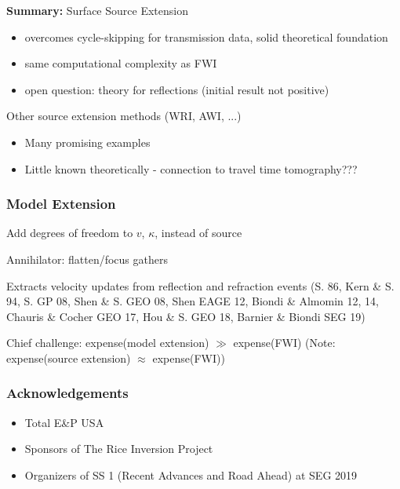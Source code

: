 \documentclass[xcolor=dvipsnames,12pt,aspectratio=169]{beamer}
\begin{document}
\begin{frame}
{\color{blue} {\bf Summary:}} Surface Source Extension 

\begin{itemize}
\item overcomes cycle-skipping for transmission data, solid theoretical foundation
\item same computational complexity as FWI
\item open question: theory for reflections {\color{blue} (initial result not positive)}
\end{itemize}

Other source extension methods (WRI, AWI, ...)

\begin{itemize}
\item Many promising examples 
\item Little known theoretically - connection to travel time tomography???
\end{itemize}
\end{frame}

\begin{frame}\frametitle{Model Extension}
Add degrees of freedom to $v$, $\kappa$, instead of source

Annihilator: flatten/focus gathers

{\color{blue}Extracts velocity updates from reflection and refraction events} (S. 86, Kern \& S. 94, S. GP 08, Shen \& S. GEO 08, Shen EAGE 12, Biondi \& Almomin 12, 14, Chauris \& Cocher GEO 17, Hou \& S. GEO 18, Barnier \& Biondi SEG 19)

Chief challenge: expense(model extension) $\gg$ expense(FWI) (Note: expense(source extension) $\approx$ expense(FWI))
\end{frame}


\begin{frame}\frametitle{Acknowledgements}
\begin{itemize}
\item Total E\&P USA
\item Sponsors of The Rice Inversion Project
\item Organizers of SS 1 (Recent Advances and Road Ahead) at SEG 2019
\end{itemize}
\end{frame}
\end{document}
